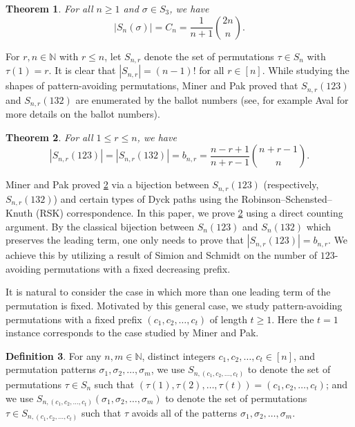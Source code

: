 \documentclass[11pt]{article}
\newtheorem{theorem}{Theorem}[section]
\theoremstyle{definition}
\newtheorem{definition}[theorem]{Definition}
\numberwithin{equation}{section}
\begin{document}
\begin{theorem} {\rm \cite[p. 238]{Knuth1973}} \label{Theorem:ClassicalSingle3}
For all $n\geq1$ and $\sigma\in S_3$, we have
\[
|S_n(\sigma)|=C_n=\frac{1}{n+1} \binom{2n}{n}.
\]
\end{theorem}



For $r,n\in\mathbb{N}$ with $r\leq n$, let $S_{n,r}$ denote the set 
of permutations $\tau\in S_n$ with $\tau(1)=r$.
It is clear that $|S_{n,r}|=(n-1)!$ for all $r\in[n]$. 
While studying the shapes of pattern-avoiding permutations, Miner and Pak \cite{MinerPak2014} proved that $S_{n,r}(123)$ and $S_{n,r}(132)$ are enumerated by the 
ballot numbers (see, for example Aval \cite{Aval2008} for more details on the ballot numbers).

\begin{theorem} {\rm \cite[Lemmas 4.1 and 5.2]{MinerPak2014}}\label{Theorem:ClassicalLeading123AND132}
    For all $1\leq r\leq n$, we have \[|S_{n,r}(123)|=|S_{n,r}(132)|=b_{n,r}=\frac{n-r+1}{n+r-1}\binom{n+r-1}{n}.\]
\end{theorem}

Miner and Pak \cite{MinerPak2014} proved \cref{Theorem:ClassicalLeading123AND132} via a bijection between $S_{n,r}(123)$ (respectively, $S_{n,r}(132)$) and certain types of Dyck paths 
using the Robinson–Schensted–Knuth (RSK) correspondence. In this paper, we prove \cref{Theorem:ClassicalLeading123AND132} using 
a direct counting argument. By the classical bijection between $S_n(123)$ and $S_n(132)$ \cite[Lemma 4.4]{Bona2022} which preserves the 
leading term, one only needs to prove that $|S_{n,r}(123)|=b_{n,r}$. We achieve this 
by utilizing a result of Simion and Schmidt \cite[Lemma 2]{SimionSchmidt1985} on the number of $123$-avoiding permutations with a 
fixed decreasing prefix.


It is natural to consider the case in which more than one leading term of the permutation is fixed.
Motivated by this general case, we study pattern-avoiding permutations 
with a fixed prefix $(c_1,c_2,\ldots,c_t)$ of length $t\geq 1$. Here the $t=1$ instance corresponds to 
the case studied by Miner and Pak.

\begin{definition}
    For any $n,m\in\mathbb{N}$, distinct integers $c_1,c_2,\ldots,c_t\in[n]$, and permutation patterns $\sigma_1,\sigma_2,\ldots,\sigma_m$, we use $S_{n,(c_1,c_2,\ldots,c_t)}$ to denote the set of permutations $\tau\in S_n$ such that $(\tau(1),\tau(2),\ldots,\tau(t))=(c_1,c_2,\ldots,c_t)$; and we use $S_{n,(c_1,c_2,\ldots,c_t)}(\sigma_1,\sigma_2,\ldots,\sigma_m)$ to denote the set of permutations $\tau\in S_{n,(c_1,c_2,\ldots,c_t)}$ such that $\tau$ 
avoids all of the patterns $\sigma_1,\sigma_2,\ldots,\sigma_m$.
\end{definition}
\end{document}
